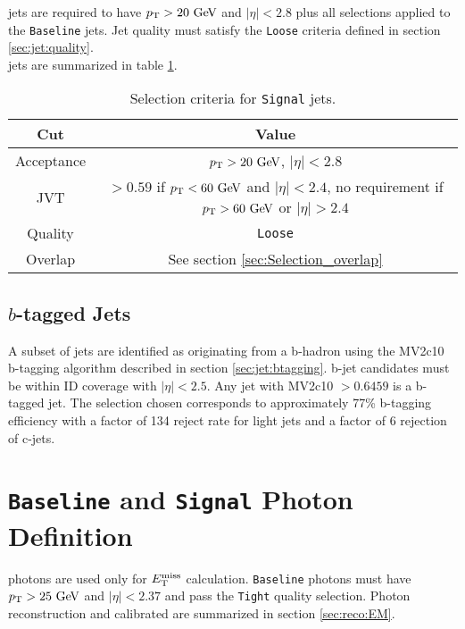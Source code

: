  jets are required to have $\pt > 20\gev$ and $|\eta|<2.8$ plus all selections applied to the {\tt Baseline} jets. Jet quality must satisfy the {\tt Loose} criteria defined in section \ref{sec:jet:quality}. \\

 jets are summarized in table \ref{tb:jets:signal}. \\

\begin{table}[htp]
  \begin{center}
    \begin{tabular}{c|c} \hline \hline
      Cut & Value \\ \hline \hline
      Acceptance & $\pT > 20\gev$, $|\eta| < 2.8$ \\ \hline
      JVT & $> 0.59$ if $\pt < 60 \gev$ and $|\eta| < 2.4$, no requirement if $\pt > 60 \gev$ or $|\eta| > 2.4$ \\ \hline
      Quality & {\tt Loose} \\ \hline
      Overlap & See section \ref{sec:Selection_overlap} \\ \hline
      \hline
    \end{tabular}
    \caption{Selection criteria for {\tt Signal} jets.} 
  \end{center}
  \label{tb:jets:signal}
\end{table}%

\subsection{\boldmath $b$-tagged Jets}

\indent A subset of jets are identified as originating from a b-hadron using the MV2c10 b-tagging algorithm described in section \ref{sec:jet:btagging}.  b-jet candidates must be within ID coverage with $|\eta|<2.5$.  Any jet with MV2c10 $ > 0.6459$ is a b-tagged jet.  The selection chosen corresponds to approximately 77\% b-tagging efficiency with a factor of 134 reject rate for light jets and a factor of 6 rejection of c-jets.\\

\section{{\tt Baseline} and {\tt Signal} Photon Definition}
\label{sec:PhoDef}

 photons are used only for $E_{\mathrm{T}}^{\mathrm{miss}}$ calculation.  {\tt Baseline} photons must have $\pt > 25 \gev$ and $|\eta| < 2.37$ and pass the {\tt Tight} quality selection.  Photon reconstruction and calibrated are summarized in section \ref{sec:reco:EM}. \\

